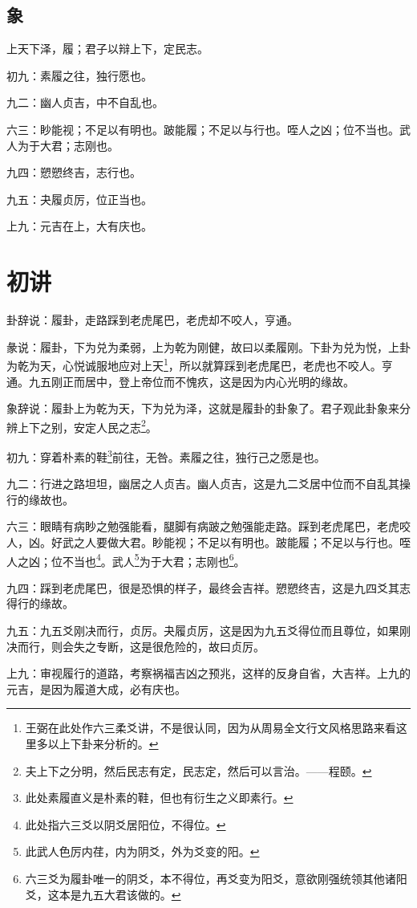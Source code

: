 \documentclass[12pt,oneside]{book}
\begin{document}
\subsection{象}
上天下泽，履；君子以辩上下，定民志。

初九：素履之往，独行愿也。

九二：幽人贞吉，中不自乱也。

六三：眇能视；不足以有明也。跛能履；不足以与行也。咥人之凶；位不当也。武人为于大君；志刚也。

九四：愬愬终吉，志行也。

九五：夬履贞厉，位正当也。

上九：元吉在上，大有庆也。

\section{初讲}
卦辞说：履卦，走路踩到老虎尾巴，老虎却不咬人，亨通。

彖说：履卦，下为兑为柔弱，上为乾为刚健，故曰以柔履刚。下卦为兑为悦，上卦为乾为天，心悦诚服地应对上天\footnote{王弼在此处作六三柔爻讲，不是很认同，因为从周易全文行文风格思路来看这里多以上下卦来分析的。}，所以就算踩到老虎尾巴，老虎也不咬人。亨通。九五刚正而居中，登上帝位而不愧疚，这是因为内心光明的缘故。

象辞说：履卦上为乾为天，下为兑为泽，这就是履卦的卦象了。君子观此卦象来分辨上下之别，安定人民之志\footnote{夫上下之分明，然后民志有定，民志定，然后可以言治。——程颐。}。

初九：穿着朴素的鞋\footnote{此处素履直义是朴素的鞋，但也有衍生之义即素行。}前往，无咎。素履之往，独行己之愿是也。

九二：行进之路坦坦，幽居之人贞吉。幽人贞吉，这是九二爻居中位而不自乱其操行的缘故也。

六三：眼睛有病眇之勉强能看，腿脚有病跛之勉强能走路。踩到老虎尾巴，老虎咬人，凶。好武之人要做大君。眇能视；不足以有明也。跛能履；不足以与行也。咥人之凶；位不当也\footnote{此处指六三爻以阴爻居阳位，不得位。}。武人\footnote{此武人色厉内荏，内为阴爻，外为爻变的阳。}为于大君；志刚也\footnote{六三爻为履卦唯一的阴爻，本不得位，再爻变为阳爻，意欲刚强统领其他诸阳爻，这本是九五大君该做的。}。

九四：踩到老虎尾巴，很是恐惧的样子，最终会吉祥。愬愬终吉，这是九四爻其志得行的缘故。

九五：九五爻刚决而行，贞厉。夬履贞厉，这是因为九五爻得位而且尊位，如果刚决而行，则会失之专断，这是很危险的，故曰贞厉。

上九：审视履行的道路，考察祸福吉凶之预兆，这样的反身自省，大吉祥。上九的元吉，是因为履道大成，必有庆也。
\end{document}
